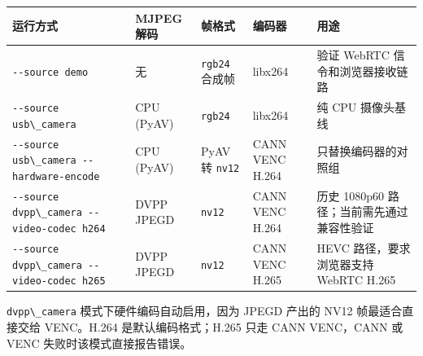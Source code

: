 \begin{longtable}[]{@{}
  >{\raggedright\arraybackslash}p{}
  >{\raggedright\arraybackslash}p{}
  >{\raggedright\arraybackslash}p{}
  >{\raggedright\arraybackslash}p{}
  >{\raggedright\arraybackslash}p{}@{}}
\toprule\noalign{}
\begin{minipage}[b]{\linewidth}\raggedright
运行方式
\end{minipage} & \begin{minipage}[b]{\linewidth}\raggedright
MJPEG 解码
\end{minipage} & \begin{minipage}[b]{\linewidth}\raggedright
帧格式
\end{minipage} & \begin{minipage}[b]{\linewidth}\raggedright
编码器
\end{minipage} & \begin{minipage}[b]{\linewidth}\raggedright
用途
\end{minipage} \\
\midrule\noalign{}
\endhead
\bottomrule\noalign{}
\endlastfoot
\passthrough{\lstinline!--source demo!} & 无 &
\passthrough{\lstinline!rgb24!} 合成帧 & libx264 & 验证 WebRTC
信令和浏览器接收链路 \\
\passthrough{\lstinline!--source usb\_camera!} & CPU (PyAV) &
\passthrough{\lstinline!rgb24!} & libx264 & 纯 CPU 摄像头基线 \\
\passthrough{\lstinline!--source usb\_camera --hardware-encode!} & CPU
(PyAV) & PyAV 转 \passthrough{\lstinline!nv12!} & CANN VENC H.264 &
只替换编码器的对照组 \\
\passthrough{\lstinline!--source dvpp\_camera --video-codec h264!} &
DVPP JPEGD & \passthrough{\lstinline!nv12!} & CANN VENC H.264 & 历史
1080p60 路径；当前需先通过兼容性验证 \\
\passthrough{\lstinline!--source dvpp\_camera --video-codec h265!} &
DVPP JPEGD & \passthrough{\lstinline!nv12!} & CANN VENC H.265 & HEVC
路径，要求浏览器支持 WebRTC H.265 \\
\end{longtable}

\passthrough{\lstinline!dvpp\_camera!} 模式下硬件编码自动启用，因为
JPEGD 产出的 NV12 帧最适合直接交给 VENC。H.264 是默认编码格式；H.265
只走 CANN VENC，CANN 或 VENC 失败时该模式直接报告错误。

